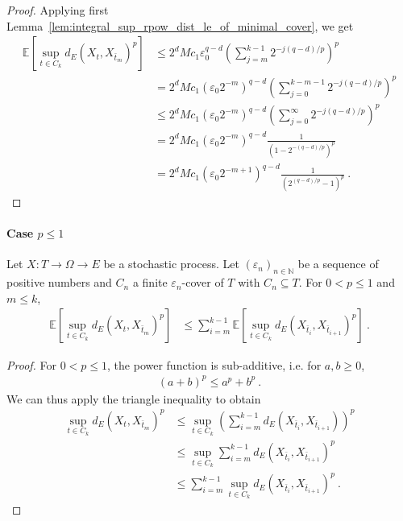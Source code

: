 \begin{proof}\leanok
Applying first Lemma~\ref{lem:integral_sup_rpow_dist_le_of_minimal_cover}, we get
\begin{align*}
  \mathbb{E} \left[\sup_{t \in C_k} d_E(X_t, X_{\bar{t}_m})^p \right]
  &\le 2^d M c_1 \varepsilon_0^{q - d} \left( \sum_{j=m}^{k-1} 2^{- j(q - d)/p} \right)^p
  \\
  &= 2^d M c_1 (\varepsilon_0 2^{-m})^{q - d} \left( \sum_{j=0}^{k-m-1} 2^{- j(q - d)/p} \right)^p
  \\
  &\le 2^d M c_1 (\varepsilon_0 2^{-m})^{q - d} \left( \sum_{j=0}^{\infty} 2^{- j(q - d)/p} \right)^p
  \\
  &= 2^d M c_1 (\varepsilon_0 2^{-m})^{q - d} \frac{1}{(1 - 2^{-(q-d)/p})^p}
  \\
  &= 2^d M c_1 (\varepsilon_0 2^{-m+1})^{q - d} \frac{1}{(2^{(q-d)/p} - 1)^p}
  \: .
\end{align*}
\end{proof}



\paragraph{Case $p \le 1$}


\begin{lemma}\label{lem:integral_sup_dist_le_sum_rpow_of_le_one}
  \leanok
Let $X : T \to \Omega \to E$ be a stochastic process.
Let $(\varepsilon_n)_{n \in \mathbb{N}}$ be a sequence of positive numbers and $C_n$ a finite $\varepsilon_n$-cover of $T$ with $C_n \subseteq T$.
For $0 < p \le 1$ and $m \le k$,
\begin{align*}
  \mathbb{E}\left[\sup_{t \in C_k} d_E(X_t, X_{\bar{t}_m})^p \right]
  &\le \sum_{i=m}^{k-1} \mathbb{E}\left[\sup_{t \in C_k} d_E(X_{\bar{t}_i}, X_{\bar{t}_{i+1}})^p\right]
  \: .
\end{align*}
\end{lemma}

\begin{proof}\leanok
For $0 < p \le 1$, the power function is sub-additive, i.e. for $a, b \ge 0$,
\begin{align*}
  (a + b)^p \le a^p + b^p
  \: .
\end{align*}
We can thus apply the triangle inequality to obtain
\begin{align*}
  \sup_{t \in C_k} d_E(X_t, X_{\bar{t}_m})^p
  &\le \sup_{t \in C_k} \left(\sum_{i=m}^{k-1} d_E(X_{\bar{t}_i}, X_{\bar{t}_{i+1}})\right)^p
  \\
  &\le \sup_{t \in C_k} \sum_{i=m}^{k-1} d_E(X_{\bar{t}_i}, X_{\bar{t}_{i+1}})^p
  \\
  &\le \sum_{i=m}^{k-1} \sup_{t \in C_k} d_E(X_{\bar{t}_i}, X_{\bar{t}_{i+1}})^p
  \: .
\end{align*}
\end{proof}


